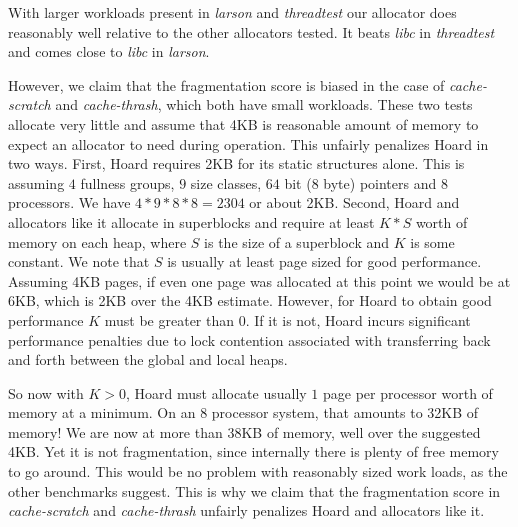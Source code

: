 \documentclass[oneside]{amsart}
\theoremstyle{definition}
\theoremstyle{remark}
\numberwithin{equation}{section}
\begin{document}
With larger workloads present in \emph{larson} and \emph{threadtest} our allocator does
reasonably well relative to the other allocators tested. It beats \emph{libc} in
\emph{threadtest} and comes close to \emph{libc} in \emph{larson}.

However, we claim that the fragmentation score is biased in the case of \emph{cache-scratch} and
\emph{cache-thrash}, which both have small workloads. These two tests allocate very little and
assume that 4KB is reasonable amount of memory to expect an allocator to need during operation. This
unfairly penalizes Hoard in two ways. First, Hoard requires 2KB for its static structures alone.
This is assuming $4$ fullness groups, $9$ size classes, $64$ bit ($8$ byte) pointers and $8$
processors. We have $4*9*8*8 = 2304$ or about 2KB. Second, Hoard and allocators like it allocate in
superblocks and require at least $K*S$ worth of memory on each heap, where $S$ is the size of a
superblock and $K$ is some constant. We note that $S$ is usually at least page sized for good
performance. Assuming 4KB pages, if even one page was allocated at this point we would be at 6KB,
which is 2KB over the 4KB estimate. However, for Hoard to obtain good performance $K$ must be
greater than $0$. If it is not, Hoard incurs significant performance penalties due to lock
contention associated with transferring back and forth between the global and local heaps.

So now with $K > 0$, Hoard must allocate usually $1$ page per processor worth of memory at a
minimum. On an $8$ processor system, that amounts to 32KB of memory! We are now at more than 38KB of
memory, well over the suggested 4KB. Yet it is not fragmentation, since internally there is plenty
of free memory to go around. This would be no problem with reasonably sized work loads, as the
other benchmarks suggest. This is why we claim that the fragmentation score in \emph{cache-scratch}
and \emph{cache-thrash} unfairly penalizes Hoard and allocators like it.




\end{document}
